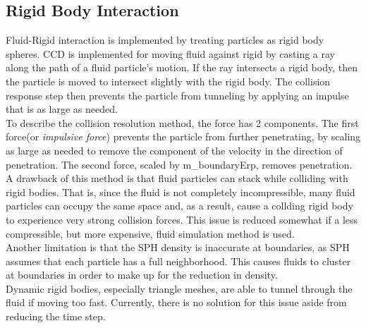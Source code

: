 \documentclass[]{article}
\begin{document}
	\subsection{Rigid Body Interaction}
		Fluid-Rigid interaction is implemented by treating particles as rigid body spheres.
		CCD is implemented for moving fluid against rigid by casting a ray along the path of
		a fluid particle's motion. If the ray intersects a rigid body, then the particle is moved
		to intersect slightly with the rigid body. The collision response step then prevents the particle
		from tunneling by applying an impulse that is as large as needed.\\
		
		To describe the collision resolution method, the force has 2 components. The first force(or \textit{impulsive force}) 
		prevents the particle from further penetrating, by scaling as large as needed to remove the component of the velocity
		in the direction of penetration. The second force, scaled by m\_boundaryErp, removes penetration.\\
		
		A drawback of this method is that fluid particles can stack while colliding with rigid bodies.
		That is, since the fluid is not completely incompressible, many fluid particles can occupy the same
		space and, as a result, cause a collding rigid body to experience very strong collision forces. This issue is
		reduced somewhat if a less compressible, but more expensive, fluid simulation method is used.\\
		
		Another limitation is that the SPH density is inaccurate at boundaries, as SPH assumes that
		each particle has a full neighborhood. This causes fluids to cluster at boundaries in order to make 
		up for the reduction in density.\\
		
		Dynamic rigid bodies, especially triangle meshes, are able to tunnel through the fluid
		if moving too fast. Currently, there is no solution for this issue aside from reducing the
		time step.
	
\end{document}
